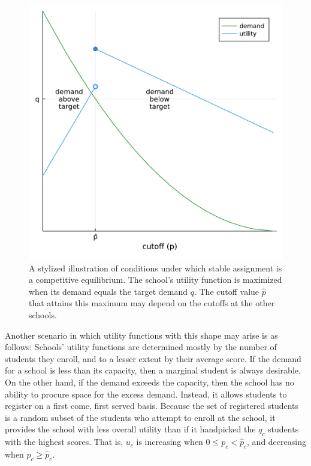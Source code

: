 \documentclass[12pt]{article}
\theoremstyle{definition}
\begin{document}
\begin{figure}
\begin{center}\includegraphics[width=0.7\linewidth, ]{plots/stylized-utility.pdf}\end{center}
\captionsetup{singlelinecheck=off}
    \caption[.]{A stylized illustration of conditions under which stable assignment is a competitive equilibrium. The school's utility function is maximized when its demand equals the target demand $q$. The cutoff value $\hat p$ that attains this maximum may depend on the cutoffs at the other schools.}
\label{stylized-utility}
\end{figure}

Another scenario in which utility functions with this shape may arise is as follows: Schools' utility functions are determined mostly by the number of students they enroll, and to a lesser extent by their average score. If the demand for a school is less than its capacity, then a marginal student is always desirable. On the other hand, if the demand exceeds the capacity, then the school has no ability to procure space for the excess demand. Instead, it allows students to register on a first come, first served basis. Because the set of registered students is a random subset of the students who attempt to enroll at the school, it provides the school with less overall utility than if it handpicked the $q_c$ students with the highest scores. That is, $u_c$ is increasing when $0 \leq p_c < \hat p_c$, and decreasing when $p_c \geq \hat p_c$. 
\end{document}
